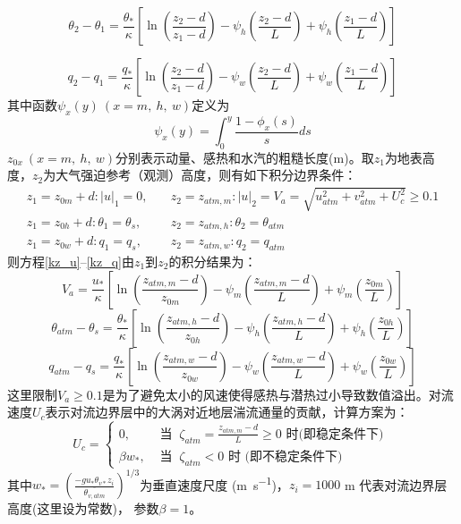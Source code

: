 \begin{equation}
\theta_{2}-\theta_{1}=\frac{\theta_{*}}{\kappa}\left[\ln \left(\frac{z_{2}-d}{z_{1}-d}\right)-\psi_{h}\left(\frac{z_{2}-d}{L}\right)+\psi_{h}\left(\frac{z_{1}-d}{L}\right)\right]
\end{equation}

\begin{equation}
q_{2}-q_{1}=\frac{q_{*}}{\kappa}\left[\ln \left(\frac{z_{2}-d}{z_{1}-d}\right)-\psi_{w}\left(\frac{z_{2}-d}{L}\right)+\psi_{w}\left(\frac{z_{1}-d}{L}\right)\right]
\end{equation}
其中函数$\psi_x\left(y\right)\ (x=m,\ h,\ w)$定义为
\begin{equation}
\psi_{x}(y)=\int_{0}^{y} \frac{1-\phi_{x}(s)}{s} d s
\end{equation}
$z_{0x}\ (x=m,\ h,\ w)$分别表示动量、感热和水汽的粗糙长度(m)。取$z_1$为地表高度，$z_2$为大气强迫参考（观测）高度，则有如下积分边界条件：
\begin{equation}\label{VaIni}
\begin{array}{ll}z_{1}=z_{0 m}+d:|u|_{1}=0, \quad & z_{2}=z_{atm, m}: |u|_{2}=V_{a}=\sqrt{u_{atm}^{2}+v_{atm}^{2}+U_{c}^{2}} \geq 0.1 \\ 
     z_{1}=z_{0 h}+d: \theta_{1}=\theta_{s}, & z_{2}=z_{atm, h}: \theta_{2}=\theta_{atm} \\ 
     z_{1}=z_{0 w}+d: q_{1}=q_{s}, & z_{2}=z_{atm, w}: q_{2}=q_{atm}\end{array}
\end{equation}
则方程\eqref{kz_u}--\eqref{kz_q}由$z_1$到$z_2$的积分结果为：
\begin{equation}\label{Va}
V_{a}=\frac{u_{*}}{\kappa}\left[\ln \left(\frac{z_{atm, m}-d}{z_{0 m}}\right)-\psi_{m}\left(\frac{z_{atm, m}-d}{L}\right)+\psi_{m}\left(\frac{z_{0 m}}{L}\right)\right]
\end{equation}
\begin{equation}\label{theta_atm-theta_s}
\theta_{atm}-\theta_{s}=\frac{\theta_{*}}{\kappa}\left[\ln \left(\frac{z_{atm, h}-d}{z_{0 h}}\right)-\psi_{h}\left(\frac{z_{atm, h}-d}{L}\right)+\psi_{h}\left(\frac{z_{0 h}}{L}\right)\right]
\end{equation}
\begin{equation}\label{q_atm-qs}
q_{atm}-q_{s}=\frac{q_{*}}{\kappa}\left[\ln \left(\frac{z_{atm, w}-d}{z_{0 w}}\right)-\psi_{w}\left(\frac{z_{atm, w}-d}{L}\right)+\psi_{w}\left(\frac{z_{0 w}}{L}\right)\right]
\end{equation}
这里限制$V_a\geq0.1$是为了避免太小的风速使得感热与潜热过小导致数值溢出。对流速度$U_c$表示对流边界层中的大涡对近地层湍流通量的贡献，计算方案为：
\begin{equation}
U_{c}= \begin{cases}
 0, & \text { 当 }\ \zeta_{atm}=\frac{z_{atm, m}-d}{L} \geq 0 \text { 时(即稳定条件下) } \\
\beta w_{*}, & \text { 当 }\ \zeta_{atm}<0 \text { 时 (即不稳定条件下) }
\end{cases}
\end{equation}
其中$w_\ast={(\frac{-gu_\ast\theta_{v\ast}z_i}{\overline{\theta_{v,atm}}})}^{1/3}$为垂直速度尺度 (\unit{m.s^{-1}})，$z_i=1000$ m 代表对流边界层高度(这里设为常数)，
参数$\beta=1$。

